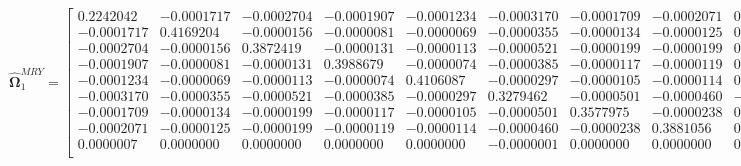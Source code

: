 \documentclass{article}\usepackage[]{graphicx}\usepackage[]{xcolor}
\def\bs{\boldsymbol}
\begin{document}
 \[
 \widehat{\bs{\Omega}}_{1}^{MRY} = 
 
  \begin{bmatrix}
 
 
 
 0.2242042 & -0.0001717 & -0.0002704 & -0.0001907 & -0.0001234 & -0.0003170 & -0.0001709 & -0.0002071 & 0.0000007\\
 
 -0.0001717 & 0.4169204 & -0.0000156 & -0.0000081 & -0.0000069 & -0.0000355 & -0.0000134 & -0.0000125 & 0.0000000\\
 
 -0.0002704 & -0.0000156 & 0.3872419 & -0.0000131 & -0.0000113 & -0.0000521 & -0.0000199 & -0.0000199 & 0.0000000\\
 
 -0.0001907 & -0.0000081 & -0.0000131 & 0.3988679 & -0.0000074 & -0.0000385 & -0.0000117 & -0.0000119 & 0.0000000\\
 
 -0.0001234 & -0.0000069 & -0.0000113 & -0.0000074 & 0.4106087 & -0.0000297 & -0.0000105 & -0.0000114 & 0.0000000\\
 
 -0.0003170 & -0.0000355 & -0.0000521 & -0.0000385 & -0.0000297 & 0.3279462 & -0.0000501 & -0.0000460 & -0.0000001\\
 
 -0.0001709 & -0.0000134 & -0.0000199 & -0.0000117 & -0.0000105 & -0.0000501 & 0.3577975 & -0.0000238 & 0.0000000\\
 
 -0.0002071 & -0.0000125 & -0.0000199 & -0.0000119 & -0.0000114 & -0.0000460 & -0.0000238 & 0.3881056 & 0.0000000\\
 
 0.0000007 & 0.0000000 & 0.0000000 & 0.0000000 & 0.0000000 & -0.0000001 & 0.0000000 & 0.0000000 & 0.5186685\\
 
 
 \end{bmatrix}
 \]
 
\end{document}
